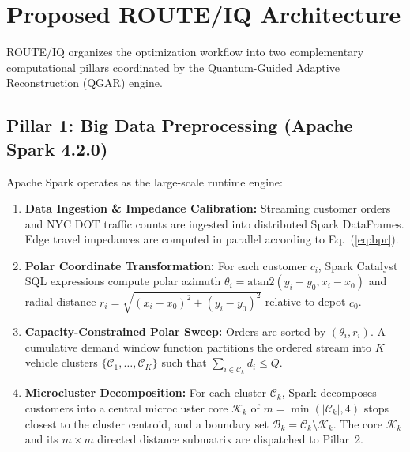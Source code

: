 \documentclass[journal,10pt]{IEEEtran}
\begin{document}
\section{Proposed ROUTE/IQ Architecture}
ROUTE/IQ organizes the optimization workflow into two complementary computational pillars coordinated by the Quantum-Guided Adaptive Reconstruction (QGAR) engine.

\subsection{Pillar 1: Big Data Preprocessing (Apache Spark 4.2.0)}
Apache Spark operates as the large-scale runtime engine:
\begin{enumerate}
    \item \textbf{Data Ingestion \& Impedance Calibration:} Streaming customer orders and NYC DOT traffic counts are ingested into distributed Spark DataFrames. Edge travel impedances are computed in parallel according to Eq.~(\ref{eq:bpr}).
    \item \textbf{Polar Coordinate Transformation:} For each customer $c_i$, Spark Catalyst SQL expressions compute polar azimuth $\theta_i = \text{atan2}(y_i - y_0, x_i - x_0)$ and radial distance $r_i = \sqrt{(x_i - x_0)^2 + (y_i - y_0)^2}$ relative to depot $c_0$.
    \item \textbf{Capacity-Constrained Polar Sweep:} Orders are sorted by $(\theta_i, r_i)$. A cumulative demand window function partitions the ordered stream into $K$ vehicle clusters $\{\mathcal{C}_1, \dots, \mathcal{C}_K\}$ such that $\sum_{i \in \mathcal{C}_k} d_i \le Q$.
    \item \textbf{Microcluster Decomposition:} For each cluster $\mathcal{C}_k$, Spark decomposes customers into a central microcluster core $\mathcal{K}_k$ of $m = \min(|\mathcal{C}_k|, 4)$ stops closest to the cluster centroid, and a boundary set $\mathcal{B}_k = \mathcal{C}_k \setminus \mathcal{K}_k$. The core $\mathcal{K}_k$ and its $m \times m$ directed distance submatrix are dispatched to Pillar~2.
\end{enumerate}
\end{document}
